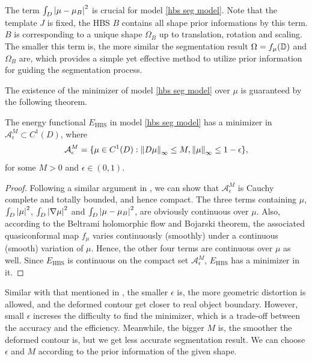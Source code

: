 \documentclass[review,onefignum,onetabnum]{siamonline190516}
\begin{document}
The term $\int_D \left\vert \mu - \mu_B \right\vert^2$ is crucial for model \ref{hbs seg model}. Note that the template $J$ is fixed, the HBS $B$ contains all shape prior informations by this term. $B$ is corresponding to a unique shape $\Omega_B$ up to translation, rotation and scaling. The smaller this term is, the more similar the segmentation result $\Omega = f_\mu(\mathbb{D})$ and $\Omega_B$ are, which provides a simple yet effective method to utilize prior information for guiding the segmentation process.

The existence of the minimizer of model \ref{hbs seg model} over $\mu$ is guaranteed by the following theorem.
\begin{theorem}\label{existence}
    The energy functional $E_{\text{HBS}}$ in model \ref{hbs seg model} has a minimizer in $\mathcal{A}^M_\epsilon \subset C^1(D)$, where
    \begin{equation*}
        \mathcal{A}^M_\epsilon = \{ \mu \in C^1(D) : \left\Vert D \mu \right\Vert_\infty \le M, \left\Vert \mu \right\Vert_\infty \le 1 - \epsilon \},
    \end{equation*}
    for some $M > 0$ and $\epsilon \in (0, 1)$.
\end{theorem}

\begin{proof}
    Following a similar argument in \cite{}, we can show that $\mathcal{A}^M_\epsilon$ is Cauchy complete and totally bounded, and hence compact. The three terms containing $\mu$, $\int_D \left\vert \mu \right\vert^2$, $\int_D \left\vert \nabla \mu \right\vert^2$ and $\int_D \left\vert \mu - \mu_B \right\vert^2$, are obviously continuous over $\mu$. Also, according to the Beltrami holomorphic flow and Bojarski theorem, the associated quasiconformal map $f_\mu$ varies continuously (smoothly) under a continuous (smooth) variation of $\mu$. Hence, the other four terms are continuous over $\mu$ as well. Since $E_\text{HBS}$ is continuous on the compact set $\mathcal{A}^M_\epsilon$, $E_\text{HBS}$ has a minimizer in it.
\end{proof}

Similar with that mentioned in \cite{}, the smaller $\epsilon$ is, the more geometric distortion is allowed, and the deformed contour get closer to real object boundary. However, small $\epsilon$ increses the difficulty to find the minimizer, which is a trade-off between the accuracy and the efficiency. Meanwhile, the bigger $M$ is, the smoother the deformed contour is, but we get less accurate segmentation result. We can choose $\epsilon$ and $M$ according to the prior information of the given shape.
\end{document}
